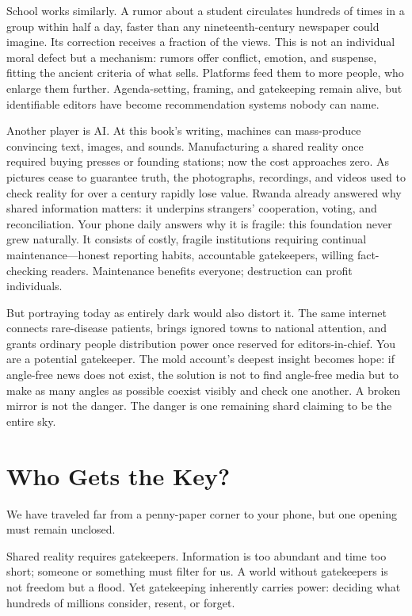 School works similarly. A rumor about a student circulates hundreds of times in a group within half a day, faster than any nineteenth-century newspaper could imagine. Its correction receives a fraction of the views. This is not an individual moral defect but a mechanism: rumors offer conflict, emotion, and suspense, fitting the ancient criteria of what sells. Platforms feed them to more people, who enlarge them further. Agenda-setting, framing, and gatekeeping remain alive, but identifiable editors have become recommendation systems nobody can name.

Another player is AI. At this book's writing, machines can mass-produce convincing text, images, and sounds. Manufacturing a shared reality once required buying presses or founding stations; now the cost approaches zero. As pictures cease to guarantee truth, the photographs, recordings, and videos used to check reality for over a century rapidly lose value. Rwanda already answered why shared information matters: it underpins strangers' cooperation, voting, and reconciliation. Your phone daily answers why it is fragile: this foundation never grew naturally. It consists of costly, fragile institutions requiring continual maintenance---honest reporting habits, accountable gatekeepers, willing fact-checking readers. Maintenance benefits everyone; destruction can profit individuals.

But portraying today as entirely dark would also distort it. The same internet connects rare-disease patients, brings ignored towns to national attention, and grants ordinary people distribution power once reserved for editors-in-chief. You are a potential gatekeeper. The mold account's deepest insight becomes hope: if angle-free news does not exist, the solution is not to find angle-free media but to make as many angles as possible coexist visibly and check one another. A broken mirror is not the danger. The danger is one remaining shard claiming to be the entire sky.

\section{Who Gets the Key?}
We have traveled far from a penny-paper corner to your phone, but one opening must remain unclosed.

Shared reality requires gatekeepers. Information is too abundant and time too short; someone or something must filter for us. A world without gatekeepers is not freedom but a flood. Yet gatekeeping inherently carries power: deciding what hundreds of millions consider, resent, or forget.

